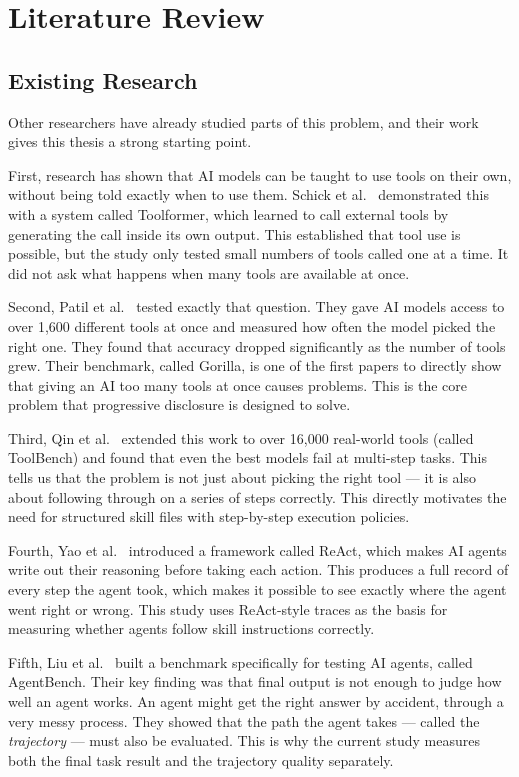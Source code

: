 \section{Literature Review}
\label{sec:literature}

\subsection{Existing Research}

Other researchers have already studied parts of this problem, and their work gives this thesis a strong starting point.

First, research has shown that AI models can be taught to use tools on their own, without being told exactly when to use them. Schick et al.\ \cite{schick2023toolformer} demonstrated this with a system called Toolformer, which learned to call external tools by generating the call inside its own output. This established that tool use is possible, but the study only tested small numbers of tools called one at a time. It did not ask what happens when many tools are available at once.

Second, Patil et al.\ \cite{patil2023gorilla} tested exactly that question. They gave AI models access to over 1,600 different tools at once and measured how often the model picked the right one. They found that accuracy dropped significantly as the number of tools grew. Their benchmark, called Gorilla, is one of the first papers to directly show that giving an AI too many tools at once causes problems. This is the core problem that progressive disclosure is designed to solve.

Third, Qin et al.\ \cite{qin2023toolllm} extended this work to over 16,000 real-world tools (called ToolBench) and found that even the best models fail at multi-step tasks. This tells us that the problem is not just about picking the right tool --- it is also about following through on a series of steps correctly. This directly motivates the need for structured skill files with step-by-step execution policies.

Fourth, Yao et al.\ \cite{yao2022react} introduced a framework called ReAct, which makes AI agents write out their reasoning before taking each action. This produces a full record of every step the agent took, which makes it possible to see exactly where the agent went right or wrong. This study uses ReAct-style traces as the basis for measuring whether agents follow skill instructions correctly.

Fifth, Liu et al.\ \cite{liu2023agentbench} built a benchmark specifically for testing AI agents, called AgentBench. Their key finding was that final output is not enough to judge how well an agent works. An agent might get the right answer by accident, through a very messy process. They showed that the path the agent takes --- called the \textit{trajectory} --- must also be evaluated. This is why the current study measures both the final task result and the trajectory quality separately.

